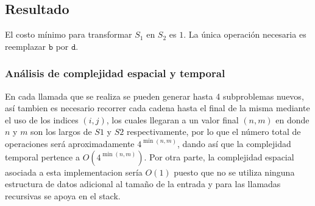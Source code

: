 \subsection*{Resultado}

El costo mínimo para transformar \( S_1 \) en \( S_2 \) es \( 1 \). La única operación necesaria es reemplazar \( \texttt{b} \) por \( \texttt{d} \).

\subsubsection{Análisis de complejidad espacial y temporal}

    En cada llamada que se realiza se pueden generar hasta 4 subproblemas nuevos, así tambien es necesario recorrer cada cadena hasta el final de la misma mediante 
    el uso de los indices $(i,j)$, los cuales llegaran a un valor final $(n,m)$ en donde $n$ y $m$ son los largos de $S1$ y $S2$ respectivamente, por lo que el 
    número total de operaciones será aproximadamente $4^{\min(n,m)}$, dando así que la complejidad temporal pertence a $O(4^{\min(n,m)})$. Por otra parte,
    la complejidad espacial asociada a esta implementacion sería $O(1)$ puesto que no se utiliza ninguna estructura de datos adicional al tamaño de la entrada y
    para las llamadas recursivas se apoya en el stack.

